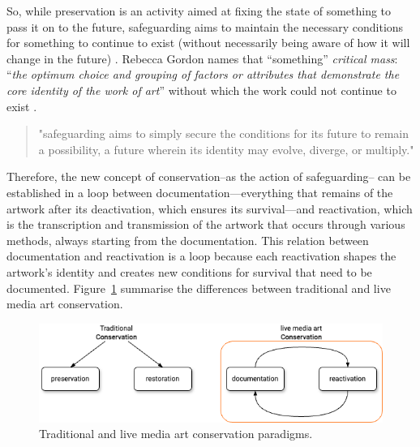 So, while preservation is an activity aimed at fixing the state of something to pass it on to the future, safeguarding aims to maintain the necessary conditions for something to continue to exist (without necessarily being aware of how it will change in the future) \cite{castriota2019authenticity}. Rebecca Gordon names that ``something'' \textit{critical mass}: ``\textit{the optimum choice and grouping of factors or attributes that demonstrate the core identity of the work of art}'' without which the work could not continue to exist \cite{gordon2014identifying}.
\begin{quote}
"safeguarding aims to simply secure the conditions for its future to remain a possibility, a future wherein its identity may evolve, diverge, or multiply." \cite{castriota2019authenticity}
\end{quote}
Therefore, the new concept of conservation–as the action of safeguarding– can be established in a loop between documentation—everything that remains of the artwork after its deactivation, which ensures its survival—and reactivation, which is the transcription and transmission of the artwork that occurs through various methods, always starting from the documentation. This relation between documentation and reactivation is a loop because each reactivation shapes the artwork’s identity and creates new conditions for survival that need to be documented. Figure~\ref{fig:c3-conservation} summarise the differences between traditional and live media art conservation.
\begin{figure}[!h]
    \centering
    \includegraphics[width=\linewidth]{chapters/2-new_conservation_paradigms/image/graph02-conservation.png}
    \caption{Traditional and live media art conservation paradigms.}
    \label{fig:c3-conservation}
\end{figure}

